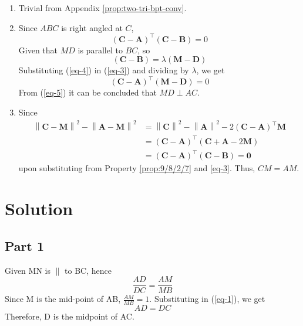 \documentclass[journal,10pt,twocolumn]{article}
\providecommand{\norm}[1]{\left\lVert#1\right\rVert}
\let\vec\mathbf
\providecommand{\brak}[1]{\ensuremath{\left(#1\right)}}
\begin{document}
	\begin{enumerate}
\item Trivial from  Appendix
		\label{prop:9/8/2/7}
	  \ref{prop:two-tri-bpt-conv}.
  \item 
Since $ABC$ is right angled at $C$,
\begin{equation}
	(\vec{C}-\vec{A})^{\top}(\vec{C}-\vec{B}) = 0	
\label{eq-3}
\end{equation}
Given that $MD$ is parallel to $BC$, so
\begin{equation}
	(\vec{C}-\vec{B}) = \lambda(\vec{M}-\vec{D})
\label{eq-4}
\end{equation}
Substituting (\ref{eq-4}) in (\ref{eq-3}) and dividing by $\lambda$, we get
\begin{equation}
	(\vec{C}-\vec{A})^{\top}(\vec{M}-\vec{D}) = 0	
\label{eq-5}
\end{equation}
From (\ref{eq-5}) it can be concluded that $MD \perp AC$.
\item Since
\begin{align}
	\norm{\vec{C}-\vec{M}}^2-\norm{\vec{A}-\vec{M}}^2 &= 	
	\norm{\vec{C}}^2-\norm{\vec{A}}^2-2\brak{\vec{C}-\vec{A}}^{\top}\vec{M} 
	\\
	&=\brak{\vec{C}-\vec{A}}^{\top}\brak{\vec{C}+\vec{A}-2\vec{M}} 
	\\
	&=\brak{\vec{C}-\vec{A}}^{\top}\brak{\vec{C}-\vec{B}} = \vec{0} 
\label{eq:9/8/2/7/sides}
\end{align}
upon substituting from 
Property		\ref{prop:9/8/2/7}
and 
\eqref{eq-3}.  Thus, $CM = AM$.

	\end{enumerate}

\iffalse
\section*{Solution}

\subsection*{Part 1}
Given MN is $\parallel$ to BC, hence\\
\begin{equation}
\frac{AD}{DC} = \frac{AM}{MB}
\label{eq-1}
\end{equation}
Since M is the mid-point of AB, $\frac{AM}{MB} = 1$. Substituting in (\ref{eq-1}), we get\\
\begin{equation}
AD = DC
\label{eq-2}
\end{equation}
Therefore, D is the midpoint of AC.
\end{document}
